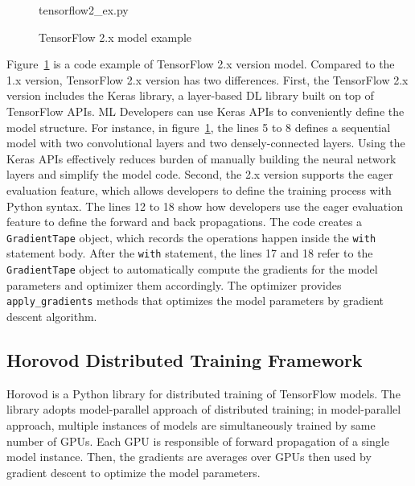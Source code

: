 \begin{figure}[ht!]

{tensorflow2_ex.py}
  \caption{TensorFlow 2.x model example}
\label{fig:back:tf2}
\end{figure}

Figure~\ref{fig:back:tf2} is a code example of TensorFlow 2.x version model.
Compared to the 1.x version, TensorFlow 2.x version has two differences.
First, the TensorFlow 2.x version includes the Keras library, a layer-based
DL library built on top of TensorFlow APIs.
ML Developers can use Keras APIs to conveniently define the model structure.
For instance, in figure~\ref{fig:back:tf2},
the lines 5 to 8 defines a sequential model with two convolutional layers and
two densely-connected layers.
Using the Keras APIs effectively reduces burden of manually building the neural
network layers and simplify the model code.
Second, the 2.x version supports the eager evaluation feature, which allows
developers to define the training process with Python syntax.
The lines 12 to 18 show how developers use the eager evaluation feature
to define the forward and back propagations. 
The code creates a {\tt GradientTape} object, which records the operations
happen inside the {\tt with} statement body.
After the {\tt with} statement, the lines 17 and 18 refer to the 
{\tt GradientTape} object to automatically compute the gradients 
for the model parameters and optimizer them accordingly.
The optimizer provides {\tt apply\_gradients} methods that optimizes 
the model parameters by gradient descent algorithm. 

\subsection{Horovod Distributed Training Framework}



Horovod is a Python library for distributed training of TensorFlow models.
The library adopts model-parallel approach of distributed training;
in model-parallel approach, multiple instances of models are simultaneously
trained by same number of GPUs.
Each GPU is responsible of forward propagation of a single model instance.
Then, the gradients are averages over GPUs then used by gradient descent
to optimize the model parameters. 

